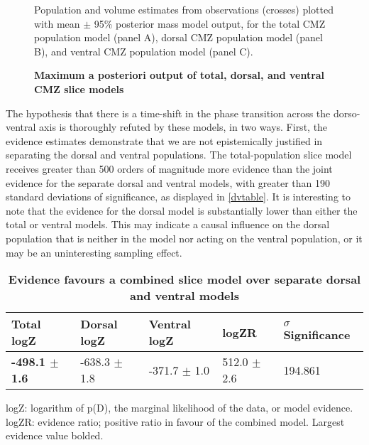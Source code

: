 \begin{figure}[!h]
    \caption{{\bf Maximum a posteriori output of total, dorsal, and ventral CMZ slice models}}
    \label{dvMAPout}
    Population and volume estimates from observations (crosses) plotted with mean $\pm$ 95\% posterior mass model output, for the total CMZ population model (panel A), dorsal CMZ population model (panel B), and ventral CMZ population model (panel C).
\end{figure}

The hypothesis that there is a time-shift in the phase transition across the dorso-ventral axis is thoroughly refuted by these models, in two ways. First, the evidence estimates demonstrate that we are not epistemically justified in separating the dorsal and ventral populations. The total-population slice model receives greater than 500 orders of magnitude more evidence than the joint evidence for the separate dorsal and ventral models, with greater than 190 standard deviations of significance, as displayed in \autoref{dvtable}. It is interesting to note that the evidence for the dorsal model is substantially lower than either the total or ventral models. This may indicate a causal influence on the dorsal population that is neither in the model nor acting on the ventral population, or it may be an uninteresting sampling effect. 

\begin{table}[!ht]
    \centering
    \caption{{\bf Evidence favours a combined slice model over separate dorsal and ventral models}}
    \begin{tabular}{|l|l|l|l|l|}
        \hline
        {\bf Total logZ} & {\bf Dorsal logZ} & {\bf Ventral logZ} & {\bf logZR} & {\bf $\sigma$ Significance}\\ \hline
        {\bf -498.1 $\pm$ 1.6} & -638.3 $\pm$ 1.8 & -371.7 $\pm$ 1.0 & 512.0 $\pm$ 2.6 & 194.861\\ \hline
        \end{tabular}
    \begin{flushleft} logZ: logarithm of p(D), the marginal likelihood of the data, or model evidence. logZR: evidence ratio; positive ratio in favour of the combined model. Largest evidence value bolded.
    \end{flushleft}
    \label{dvtable}
\end{table}

